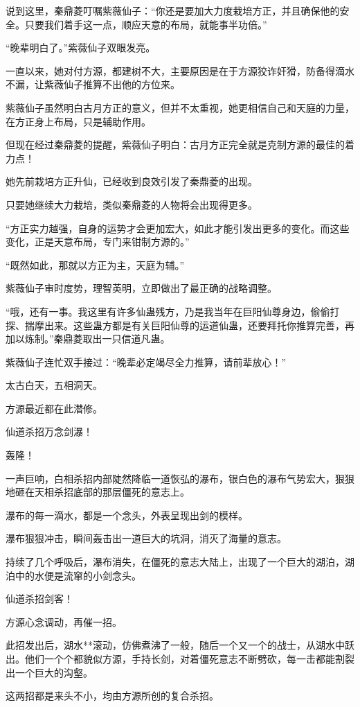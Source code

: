 \begin{this_body}
说到这里，秦鼎菱叮嘱紫薇仙子：“你还是要加大力度栽培方正，并且确保他的安全。只要我们着手这一点，顺应天意的布局，就能事半功倍。”

“晚辈明白了。”紫薇仙子双眼发亮。

一直以来，她对付方源，都建树不大，主要原因是在于方源狡诈奸猾，防备得滴水不漏，让紫薇仙子推算不出他的方位来。

紫薇仙子虽然明白古月方正的意义，但并不太重视，她更相信自己和天庭的力量，在方正身上布局，只是辅助作用。

但现在经过秦鼎菱的提醒，紫薇仙子明白：古月方正完全就是克制方源的最佳的着力点！

她先前栽培方正升仙，已经收到良效引发了秦鼎菱的出现。

只要她继续大力栽培，类似秦鼎菱的人物将会出现得更多。

“方正实力越强，自身的运势才会更加宏大，如此才能引发出更多的变化。而这些变化，正是天意布局，专门来钳制方源的。”

“既然如此，那就以方正为主，天庭为辅。”

紫薇仙子审时度势，理智英明，立即做出了最正确的战略调整。

“哦，还有一事。我这里有许多仙蛊残方，乃是我当年在巨阳仙尊身边，偷偷打探、揣摩出来。这些蛊方都是有关巨阳仙尊的运道仙蛊，还要拜托你推算完善，再加以炼制。”秦鼎菱取出一只信道凡蛊。

紫薇仙子连忙双手接过：“晚辈必定竭尽全力推算，请前辈放心！”

太古白天，五相洞天。

方源最近都在此潜修。

仙道杀招万念剑瀑！

轰隆！

一声巨响，白相杀招内部陡然降临一道恢弘的瀑布，银白色的瀑布气势宏大，狠狠地砸在天相杀招底部的那层僵死的意志上。

瀑布的每一滴水，都是一个念头，外表呈现出剑的模样。

瀑布狠狠冲击，瞬间轰击出一道巨大的坑洞，消灭了海量的意志。

持续了几个呼吸后，瀑布消失，在僵死的意志大陆上，出现了一个巨大的湖泊，湖泊中的水便是流窜的小剑念头。

仙道杀招剑客！

方源心念调动，再催一招。

此招发出后，湖水**滚动，仿佛煮沸了一般，随后一个又一个的战士，从湖水中跃出。他们一个个都貌似方源，手持长剑，对着僵死意志不断劈砍，每一击都能割裂出一个巨大的沟壑。

这两招都是来头不小，均由方源所创的复合杀招。


\end{this_body}

